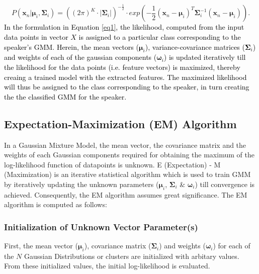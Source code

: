 \documentclass{article}
\begin{document}
{{\begin{equation}
P(\bm x_n|\bm\mu_i,\bm\Sigma_i) = \left({{(2\pi)^K\cdot |\bm\Sigma_i|}}\right)^{-\frac{1}{2}}\cdot exp\left({-\frac{1}{2} (\bm x_n-\bm\mu_i)^T\bm\Sigma_i^{-1}(\bm x_n- \bm \mu_i)}\right).
\label{eq1}
\end{equation}
}
\textcolor{black}{In the formulation in Equation \ref{eq1}, the likelihood, computed from the input data points in vector $X$ is assigned to a particular class corresponding to the speaker's GMM. Herein, the mean vectors ($\bm \mu_i$), variance-covariance matrices ($\bm\Sigma_i$) and weights of each of the gaussian components ($\bm \omega_i$) is updated iteratively till the likelihood for the data points (i.e. feature vectors) is maximized, %
thereby creaing a trained model with the extracted features. The maximized likelihood will thus be assigned to the class corresponding to the speaker, in turn creating the the classified GMM for the speaker.} 

\subsection{{{Expectation-Maximization (EM)} Algorithm}} In a Gaussian Mixture Model, the mean vector, the covariance matrix and the weights of each Gaussian components required for obtaining the maximum of the log-likelihood function of datapoints is unknown. {E (Expectation) - M (Maximization) \cite{6}} is an iterative statistical algorithm which is used to train GMM by iteratively updating the unknown parameters ($\bm\mu_i$, $\bm\Sigma_i$ \& $\bm\omega_i$) till convergence is achieved.  Consequently, the EM algorithm assumes great significance. The EM algorithm is computed as follows:
\subsubsection{{Initialization of Unknown Vector Parameter(s)}} First, the mean vector ($\bm\mu_i$), covariance matrix ($\bm\Sigma_i$) and weights ($\bm\omega_i$) for each of the $N$ Gaussian Distributions or clusters are initialized with arbitary values. From these initialized values, the initial log-likelihood is evaluated.
}
\end{document}
